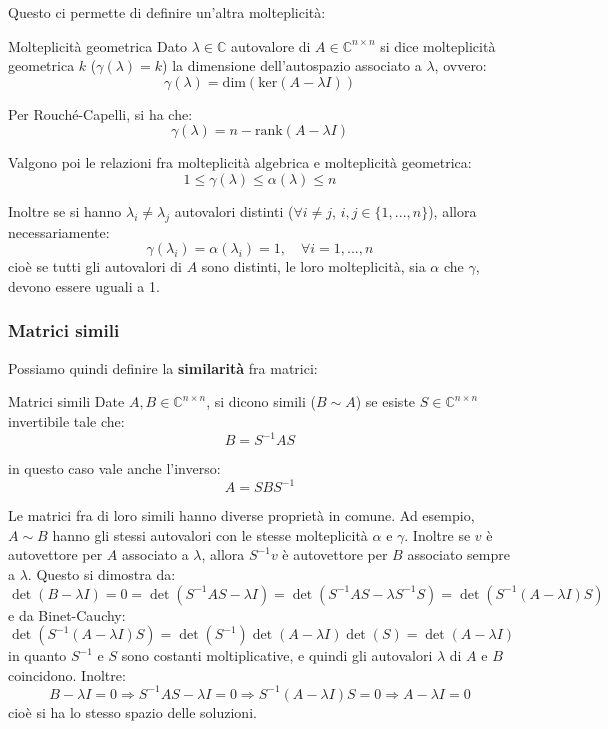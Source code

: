 \documentclass[a4paper,11pt]{article}
\begin{document}
Questo ci permette di definire un'altra molteplicità:
\begin{definition}{Molteplicità geometrica}
	Dato $\lambda \in \mathbb{C}$ autovalore di $A \in \mathbb{C}^{n \times n}$ si dice molteplicità geometrica $k$ ($\gamma(\lambda) = k$) la dimensione dell'autospazio associato a $\lambda$, ovvero:
	$$
		\gamma(\lambda) = \mathrm{dim}\left( \mathrm{ker}(A - \lambda I) \right)
	$$
\end{definition}

Per Rouché-Capelli, si ha che:
$$
\gamma(\lambda) = n - \mathrm{rank}(A - \lambda I)
$$

Valgono poi le relazioni fra molteplicità algebrica e molteplicità geometrica:
$$
1 \leq \gamma(\lambda) \leq \alpha(\lambda) \leq n
$$

Inoltre se si hanno $\lambda_i \neq \lambda_j$ autovalori distinti ($\forall i \neq j$, $i, j \in \{1, ..., n\}$), allora necessariamente:
$$
\gamma(\lambda_i) = \alpha(\lambda_i) = 1, \quad \forall i = 1 , ..., n
$$
cioè se tutti gli autovalori di $A$ sono distinti, le loro molteplicità, sia $\alpha$ che $\gamma$, devono essere uguali a 1.

\subsubsection{Matrici simili}
Possiamo quindi definire la \textbf{similarità} fra matrici:
\begin{definition}{Matrici simili}
	Date $A, B \in \mathbb{C}^{n \times n}$, si dicono simili ($B \sim A$) se esiste $S \in \mathbb{C}^{n \times n}$ invertibile tale che:
	$$
		B = S^{-1} A S
	$$
\end{definition}
in questo caso vale anche l'inverso:
$$
A = S B S^{-1}
$$

Le matrici fra di loro simili hanno diverse proprietà in comune.
Ad esempio, $A \sim B$ hanno gli stessi autovalori con le stesse molteplicità $\alpha$ e $\gamma$.
Inoltre se $v$ è autovettore per $A$ associato a $\lambda$, allora $S^{-1} v$ è autovettore per $B$ associato sempre a $\lambda$.
Questo si dimostra da:
$$
\det(B - \lambda I) = 0 = \det(S^{-1} A S - \lambda I) = \det(S^{-1} A S - \lambda S^{-1}S) = \det(S^{-1} (A - \lambda I) S)
$$
e da Binet-Cauchy:
$$
\det(S^{-1} (A - \lambda I) S) = 
\det(S^{-1}) \det(A - \lambda I) \det(S) = \det(A - \lambda I) 
$$
in quanto $S^{-1}$ e $S$ sono costanti moltiplicative, e quindi gli autovalori $\lambda$ di $A$ e $B$ coincidono.
Inoltre:
$$
B - \lambda I = 0 \Rightarrow S^{-1} A S - \lambda I = 0 \Rightarrow S^{-1}(A - \lambda I) S = 0 \Rightarrow A - \lambda I = 0
$$
cioè si ha lo stesso spazio delle soluzioni.
\end{document}
